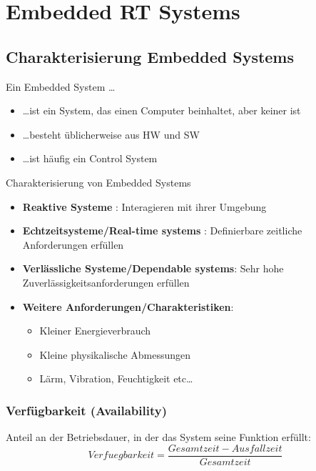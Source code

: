 \section{Embedded RT Systems }
\subsection{Charakterisierung Embedded Systems }
Ein Embedded System \ldots
\begin{itemize}
  \item \ldots ist ein System, das einen Computer beinhaltet, aber keiner ist
  \item \ldots besteht üblicherweise aus HW und SW
  \item \ldots ist häufig ein Control System\\
\end{itemize}
Charakterisierung von Embedded Systems
  \begin{itemize}
    \item \textbf{Reaktive Systeme} : Interagieren mit ihrer Umgebung
    \item \textbf{Echtzeitsysteme/Real-time systems} : Definierbare zeitliche
    Anforderungen erfüllen
    \item \textbf{Verlässliche Systeme/Dependable systems}: Sehr hohe
    Zuverlässigkeitsanforderungen erfüllen
    \item \textbf{Weitere Anforderungen/Charakteristiken}: 
    \begin{itemize}
      \item Kleiner Energieverbrauch
      \item Kleine physikalische Abmessungen
      \item Lärm, Vibration, Feuchtigkeit etc\ldots
    \end{itemize}
  \end{itemize}

\subsubsection{Verfügbarkeit (Availability)}
Anteil an der Betriebsdauer, in  der das System seine Funktion
erfüllt:
\begin{equation}
Verfuegbarkeit = \frac{Gesamtzeit-Ausfallzeit}{Gesamtzeit}
\end{equation}

